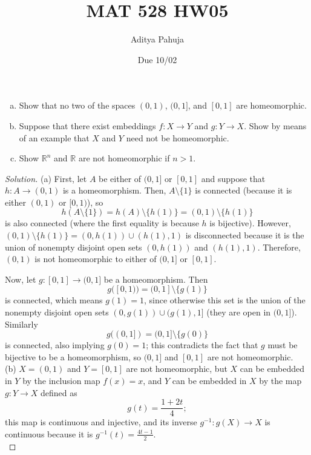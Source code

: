 \documentclass[10pt]{article}
\title{MAT 528 HW05}
\author{\large Aditya Pahuja}
\date{\large Due 10/02}
\providecommand{\RR}{\mathbb R}
\providecommand{\ii}{\item}
\providecommand{\inv}{^{-1}}
\newenvironment{soln}{\begin{proof}[Solution]}{\end{proof}}
\begin{document}
\maketitle

\begin{problem}
    [Munkres 24.1]
    \begin{enumerate}[(a)]
	\ii Show that no two of the spaces $(0,1)$, $(0,1]$, and $[0,1]$
	are homeomorphic.
	\ii Suppose that there exist embeddings $f\colon X\to Y$
	and $g\colon Y\to X$. Show by means of an example
	that $X$ and $Y$ need not be homeomorphic.
	\ii Show $\RR^n$ and $\RR$ are not homeomorphic if $n > 1$.
    \end{enumerate}
\end{problem}

\begin{soln}
    (a) First, let $A$ be either of $(0,1]$ or $[0,1]$
    and suppose that $h\colon A\to (0,1)$ is a homeomorphism.
    Then, $A\setminus\{1\}$ is connected (because it is either
    $(0,1)$ or $[0,1)$), so
    \begin{equation*}
	h(A\setminus\{1\}) = h(A)\setminus\{h(1)\} = (0,1)\setminus\{h(1)\}
    \end{equation*}
    is also connected (where the first equality is because $h$ is bijective).
    However, $(0,1)\setminus\{h(1)\} = (0,h(1))\cup(h(1),1)$
    is disconnected because it is the union of nonempty disjoint open sets
    $(0,h(1))$ and $(h(1),1)$.
    Therefore, $(0,1)$ is not homeomorphic to either of $(0,1]$ or $[0,1]$.

    Now, let $g\colon[0,1]\to(0,1]$ be a homeomorphism. Then
    \begin{equation*}
	g([0,1)) = (0,1]\setminus\{g(1)\}
    \end{equation*}
    is connected, which means $g(1) = 1$, since otherwise
    this set is the union of the nonempty disjoint open sets
    $(0,g(1))\cup(g(1),1]$ (they are open in $(0,1]$). Similarly
    \begin{equation*}
	g((0,1]) = (0,1]\setminus\{g(0)\}
    \end{equation*}
    is connected, also implying $g(0) = 1$;
    this contradicts the fact that $g$ must be bijective to be a homeomorphism,
    so $(0,1]$ and $[0,1]$ are not homeomorphic.
    \\

    (b) $X = (0,1)$ and $Y = [0,1]$ are not homeomorphic, but
    $X$ can be embedded in $Y$ by the inclusion map $f(x) = x$,
    and $Y$ can be embedded in $X$ by the map $g\colon Y\to X$ defined as
    \begin{equation*}
	g(t) = \frac{1 + 2t}4;
    \end{equation*}
    this map is continuous and injective, and its inverse
    $g\inv\colon g(X)\to X$ is continuous because it is $g\inv(t) = \frac{4t-1}2$.
    \\


\end{soln}
\end{document}
